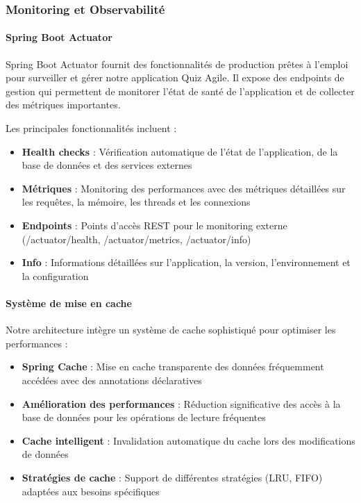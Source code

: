 \documentclass[12pt,a4paper]{report}
\begin{document}
\subsubsection{Monitoring et Observabilité}

\paragraph{Spring Boot Actuator}

Spring Boot Actuator fournit des fonctionnalités de production prêtes à l'emploi pour surveiller et gérer notre application Quiz Agile. Il expose des endpoints de gestion qui permettent de monitorer l'état de santé de l'application et de collecter des métriques importantes.

Les principales fonctionnalités incluent :
\begin{itemize}
    \item \textbf{Health checks} : Vérification automatique de l'état de l'application, de la base de données et des services externes
    \item \textbf{Métriques} : Monitoring des performances avec des métriques détaillées sur les requêtes, la mémoire, les threads et les connexions
    \item \textbf{Endpoints} : Points d'accès REST pour le monitoring externe (/actuator/health, /actuator/metrics, /actuator/info)
    \item \textbf{Info} : Informations détaillées sur l'application, la version, l'environnement et la configuration
\end{itemize}

\paragraph{Système de mise en cache}

Notre architecture intègre un système de cache sophistiqué pour optimiser les performances :

\begin{itemize}
    \item \textbf{Spring Cache} : Mise en cache transparente des données fréquemment accédées avec des annotations déclaratives
    \item \textbf{Amélioration des performances} : Réduction significative des accès à la base de données pour les opérations de lecture fréquentes
    \item \textbf{Cache intelligent} : Invalidation automatique du cache lors des modifications de données
    \item \textbf{Stratégies de cache} : Support de différentes stratégies (LRU, FIFO) adaptées aux besoins spécifiques
\end{itemize}
\end{document}
